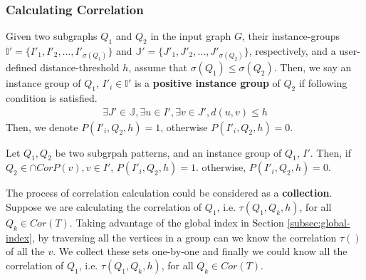 \subsubsection{Calculating Correlation}\label{subsec:calculating}
\begin{defn}
	Given two subgraphs $Q_1$ and $Q_2$ in the input graph $G$, their instance-groups
	$\mathbb{I'}=\{I'_1,I'_2,\ldots,I'_{\sigma(Q_1)}\}$ and $\mathbb{J'}=\{J'_1,J'_2,\ldots,J'_{\sigma(Q_2)}\}$,
	respectively, and a user-defined distance-threshold $h$, assume that $\sigma(Q_1) \le \sigma(Q_2)$.
	Then, we say an instance group of $Q_1$, $I'_i\in \mathbb{I'}$ is a {\bf positive instance group} of $Q_2$ if following condition is satisfied.
	\begin{align}
		\exists J' \in \mathbb{J}, \exists u \in I', \exists v \in J', d(u,v)\le h
	\end{align}
	Then, we denote $P(I'_i,Q_2,h)=1$, otherwise $P(I'_i,Q_2,h)=0$.
\end{defn}
\begin{thrm}
	Let $Q_1,Q_2$ be two subgrpah patterns, and an instance group of $Q_1$, $I'$. Then,	if $Q_2\in \cap CorP(v),v\in I'$, $P(I'_i,Q_2,h)=1$.
	otherwise, $P(I'_i,Q_2,h)=0$.
\end{thrm}
The process of correlation calculation could be considered as a {\bf collection}. Suppose we are calculating the correlation of $Q_1$, i.e. $\tau(Q_1,Q_k,h)$, for all $Q_k\in Cor(T)$. Taking advantage of the global index in Section \ref{subsec:global-index}, by traversing all the vertices in a group can we know the correlation $\tau()$ of all the $v$. We collect these sets one-by-one and finally we could know all the correlation of $Q_1$, i.e. $\tau(Q_1,Q_k,h)$, for all $Q_k\in Cor(T)$.

